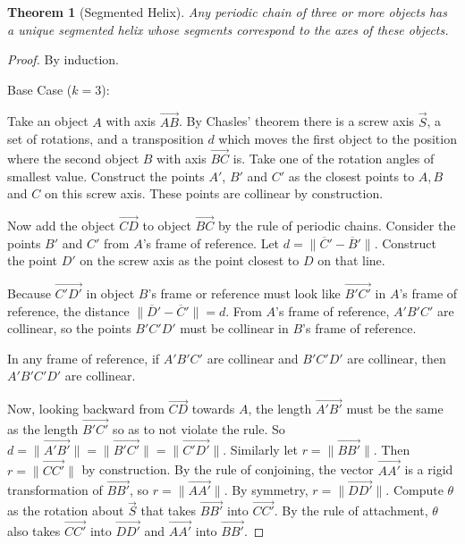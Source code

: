 \documentclass[11pt]{article}
\newtheorem{theorem}{Theorem}
\begin{document}
{\begin{theorem}[Segmented Helix]
  Any periodic chain of three or more objects has a unique segmented helix
  whose segments correspond
  to the axes of these objects.
\end{theorem}

\begin{proof}
  By induction.

  Base Case ($k = 3$):

  Take an object $A$ with axis $\overrightarrow{AB}$.
  By Chasles' theorem\cite{wiki:chasles}
  there is a screw axis $\overrightarrow{S}$,
  a set of rotations,  and a transposition $d$ which moves
  the first object to the
  position where the second object $B$ with axis $\overrightarrow{BC}$ is.
  Take one of the rotation angles of smallest value.
  Construct the points $A'$, $B'$ and $C'$ as the closest points
  to $A,B$ and $C$ on this screw axis. These points are collinear by construction.

  Now add the object $\overrightarrow{CD}$ to object $\overrightarrow{BC}$
  by the rule of periodic chains. Consider the points
  $B'$ and $C'$ from $A$'s frame of reference. Let $d = \| \overline C' - \overline B' \|$.
  Construct the point $D'$ on the screw axis as the point closest to $D$ on that line.

  Because $\overrightarrow{C'D'}$ in object $B$'s frame or reference must look like $\overrightarrow{B'C'}$ in $A$'s frame of reference,
  the distance $\| \overline D' - \overline C' \| = d$.
  From $A$'s frame of reference, $A'B'C'$ are collinear, so the points $B'C'D'$ must be collinear in
  $B$'s frame of reference.

  In any frame of reference, if $A'B'C'$ are collinear and $B'C'D'$ are collinear, then $A'B'C'D'$
  are collinear.

  Now, looking backward from $\overrightarrow{CD}$ towards $A$, the length $\overrightarrow{A'B'}$ must be the same as the
  length $\overrightarrow{B'C'}$ so as to not violate the rule. So $d = \| \overrightarrow{A'B'} \| = \| \overrightarrow{B'C'} \| = \| \overrightarrow{C'D'}\|$.
  Similarly let $r = \| \overrightarrow{B B'} \|$. Then $r = \| \overrightarrow{C C'} \|$ by construction.
  By the rule of conjoining, the vector $\overrightarrow{A A'}$ is a rigid transformation of
  $\overrightarrow{B B'}$,
so $r = \| \overrightarrow{A A'} \|$.
  By symmetry, $r = \| \overrightarrow{D D'} \|$.
  Compute $\theta$ as the rotation about $\overrightarrow{S}$ that takes $\overrightarrow{B B'}$
  into $\overrightarrow{C C'}$. By the rule
  of attachment, $\theta$ also takes $\overrightarrow{C C'}$ into $\overrightarrow{D D'}$
  and $\overrightarrow{A A'}$ into $\overrightarrow{B B'}$.


\end{proof}}
\end{document}

